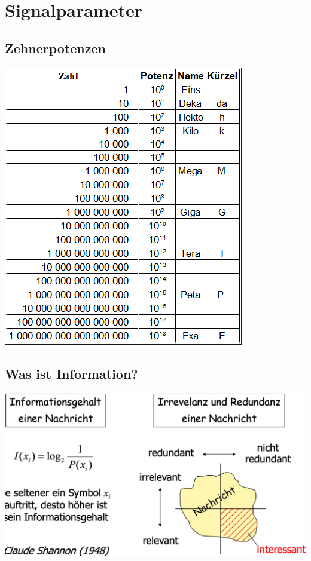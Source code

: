
\section{Signalparameter}

\subsection{Zehnerpotenzen}
\begin{center}
    \includegraphics[scale=.38]{graphic/signalparameter/zehnerpotenzen.png}
\end{center}
\vspace{-8pt}




\subsection{Was ist Information?}
\begin{center}
    \includegraphics[width=\linewidth]{graphic/signalparameter/wasist.png}
\end{center}
\vspace{-8pt}

